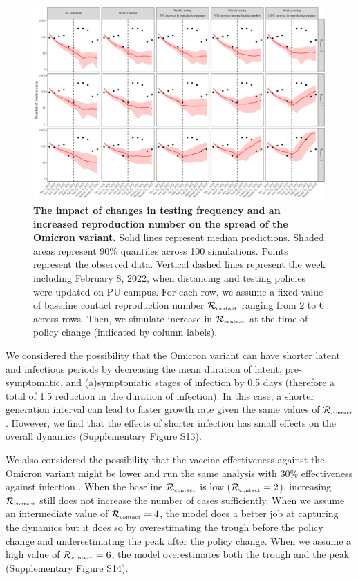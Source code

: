 \documentclass[12pt]{article}
\newcommand{\Rx}[1]{\ensuremath{{\mathcal R}_{#1}}}
\newcommand{\Rc}{\Rx{\textrm{\tiny{contact}}}}
\begin{document}
\begin{figure}[!ht]
\includegraphics[width=\textwidth]{../figure_princeton_new/figure_princeton_simulation_omicron_spring.pdf}
\caption{
\textbf{The impact of changes in testing frequency and an increased reproduction number on the spread of the Omicron variant.}
Solid lines represent median predictions.
Shaded areas represent 90\% quantiles across 100 simulations.
Points represent the observed data.
Vertical dashed lines represent the week including February 8, 2022, when distancing and testing policies were updated on PU campus.
For each row, we assume a fixed value of baseline contact reproduction number $\Rc$ ranging from 2 to 6 across rows.
Then, we simulate increase in $\Rc$ at the time of policy change (indicated by column labels).
}
\label{fig:omicron1}
\end{figure}

We considered the possibility that the Omicron variant can have shorter latent and infectious periods by decreasing the mean duration of latent, pre-symptomatic, and (a)symptomatic stages of infection by 0.5 days (therefore a total of 1.5 reduction in the duration of infection).
In this case, a shorter generation interval can lead to faster growth rate given the same values of $\Rc$ \citep{wallinga2007generation}.
However, we find that the effects of shorter infection has small effects on the overall dynamics (Supplementary Figure S13).

We also considered the possibility that the vaccine effectiveness against the Omicron variant might be lower and run the same analysis with 30\% effectiveness against infection \citep{tan2023vaccine}.
When the baseline $\Rc$ is low ($\Rc=2$), increasing $\Rc$ still does not increase the number of cases sufficiently.
When we assume an intermediate value of $\Rc=4$, the model does a better job at capturing the dynamics but it does so by overestimating the trough before the policy change and underestimating the peak after the policy change.
When we assume a high value of $\Rc=6$, the model overestimates both the trough and the peak (Supplementary Figure S14).
\end{document}
